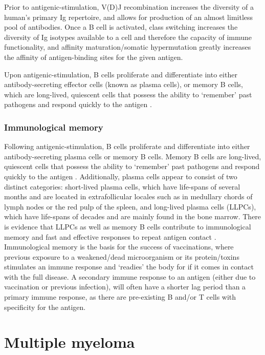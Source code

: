 Prior to antigenic-stimulation, V(D)J recombination increases the diversity of a human's primary Ig repertoire, and allows for production of an almost limitless pool of antibodies.
Once a B cell is activated, class switching increases the diversity of Ig isotypes available to a cell and therefore the capacity of immune functionality, and affinity maturation/somatic hypermutation greatly increases the affinity of antigen-binding sites for the given antigen.

Upon antigenic-stimulation, B cells proliferate and differentiate into either antibody-secreting effector cells (known as plasma cells), or memory B cells, which are long-lived, quiescent cells that possess the ability to `remember' past pathogens and respond quickly to the antigen \cite{palm2019remembrance}.

\subsubsection{Immunological memory}
Following antigenic-stimulation, B cells proliferate and differentiate into either antibody-secreting plasma cells or memory B cells.
Memory B cells are long-lived, quiescent cells that possess the ability to `remember' past pathogens and respond quickly to the antigen \cite{palm2019remembrance}.
Additionally, plasma cells appear to consist of two distinct categories: short-lived plasma cells, which have life-spans of several months and are located in extrafollicular locales such as in medullary chords of lymph nodes or the red pulp of the spleen, and long-lived plasma cells (LLPCs), which have life-spans of decades and are mainly found in the bone marrow\cite{bortnick2013and, andraud2012living}.
There is evidence that LLPCs as well as memory B cells contribute to immunological memory and fast and effective responses to repeat antigen contact \cite{ionescu2019memory}.
Immunological memory is the basis for the success of vaccinations, where previous exposure to a weakened/dead microorganism or its protein/toxins stimulates an immune response and `readies' the body for if it comes in contact with the full disease.
A secondary immune response to an antigen (either due to vaccination or previous infection), will often have a shorter lag period than a primary immune response, as there are pre-existing B and/or T cells with specificity for the antigen.

\section{Multiple myeloma}\label{sec:MM}

